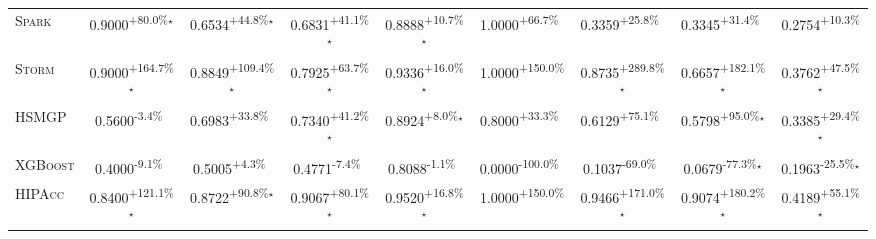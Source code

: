 \begin{table}[htbp]
\begin{tabular}{l|cccc|cccc}
\textsc{Spark} & \cellcolor{green!30}0.9000\textsuperscript{+80.0\%}$^\star$ & \cellcolor{green!30}0.6534\textsuperscript{+44.8\%}$^\star$ & \cellcolor{green!30}0.6831\textsuperscript{+41.1\%}$^\star$ & \cellcolor{green!30}0.8888\textsuperscript{+10.7\%}$^\star$ & \cellcolor{green!30}1.0000\textsuperscript{+66.7\%}$^{\,\,\,}$ & \cellcolor{green!30}0.3359\textsuperscript{+25.8\%}$^{\,\,\,}$ & \cellcolor{green!30}0.3345\textsuperscript{+31.4\%}$^{\,\,\,}$ & \cellcolor{green!30}0.2754\textsuperscript{+10.3\%}$^{\,\,\,}$ \\
\textsc{Storm} & \cellcolor{green!30}0.9000\textsuperscript{+164.7\%}$^\star$ & \cellcolor{green!30}0.8849\textsuperscript{+109.4\%}$^\star$ & \cellcolor{green!30}0.7925\textsuperscript{+63.7\%}$^\star$ & \cellcolor{green!30}0.9336\textsuperscript{+16.0\%}$^\star$ & \cellcolor{green!30}1.0000\textsuperscript{+150.0\%}$^{\,\,\,}$ & \cellcolor{green!30}0.8735\textsuperscript{+289.8\%}$^\star$ & \cellcolor{green!30}0.6657\textsuperscript{+182.1\%}$^\star$ & \cellcolor{green!30}0.3762\textsuperscript{+47.5\%}$^\star$ \\
\textsc{HSMGP} & \cellcolor{red!30}0.5600\textsuperscript{-3.4\%}$^{\,\,\,}$ & \cellcolor{green!30}0.6983\textsuperscript{+33.8\%}$^{\,\,\,}$ & \cellcolor{green!30}0.7340\textsuperscript{+41.2\%}$^\star$ & \cellcolor{green!30}0.8924\textsuperscript{+8.0\%}$^\star$ & \cellcolor{green!30}0.8000\textsuperscript{+33.3\%}$^{\,\,\,}$ & \cellcolor{green!30}0.6129\textsuperscript{+75.1\%}$^{\,\,\,}$ & \cellcolor{green!30}0.5798\textsuperscript{+95.0\%}$^\star$ & \cellcolor{green!30}0.3385\textsuperscript{+29.4\%}$^\star$ \\
\textsc{XGBoost} & \cellcolor{red!30}0.4000\textsuperscript{-9.1\%}$^{\,\,\,}$ & \cellcolor{green!30}0.5005\textsuperscript{+4.3\%}$^{\,\,\,}$ & \cellcolor{red!30}0.4771\textsuperscript{-7.4\%}$^{\,\,\,}$ & \cellcolor{red!30}0.8088\textsuperscript{-1.1\%}$^{\,\,\,}$ & \cellcolor{red!30}0.0000\textsuperscript{-100.0\%}$^{\,\,\,}$ & \cellcolor{red!30}0.1037\textsuperscript{-69.0\%}$^{\,\,\,}$ & \cellcolor{red!30}0.0679\textsuperscript{-77.3\%}$^\star$ & \cellcolor{red!30}0.1963\textsuperscript{-25.5\%}$^\star$ \\
\textsc{HIPAcc} & \cellcolor{green!30}0.8400\textsuperscript{+121.1\%}$^\star$ & \cellcolor{green!30}0.8722\textsuperscript{+90.8\%}$^\star$ & \cellcolor{green!30}0.9067\textsuperscript{+80.1\%}$^\star$ & \cellcolor{green!30}0.9520\textsuperscript{+16.8\%}$^\star$ & \cellcolor{green!30}1.0000\textsuperscript{+150.0\%}$^{\,\,\,}$ & \cellcolor{green!30}0.9466\textsuperscript{+171.0\%}$^\star$ & \cellcolor{green!30}0.9074\textsuperscript{+180.2\%}$^\star$ & \cellcolor{green!30}0.4189\textsuperscript{+55.1\%}$^\star$ \\

\end{tabular}
\end{table}
